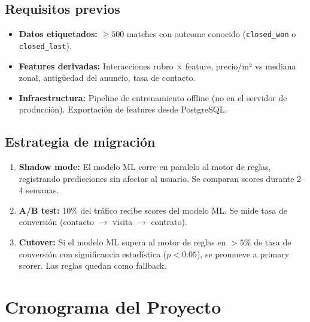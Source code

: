 \documentclass[11pt,a4paper]{article}
\begin{document}
\subsection{Requisitos previos}
\begin{itemize}
    \item \textbf{Datos etiquetados:} $\geq 500$ matches con outcome conocido (\texttt{closed\_won} o \texttt{closed\_lost}).
    \item \textbf{Features derivadas:} Interacciones rubro $\times$ feature, precio/m² vs mediana zonal, antigüedad del anuncio, tasa de contacto.
    \item \textbf{Infraestructura:} Pipeline de entrenamiento offline (no en el servidor de producción). Exportación de features desde PostgreSQL.
\end{itemize}

\subsection{Estrategia de migración}
\begin{enumerate}
    \item \textbf{Shadow mode:} El modelo ML corre en paralelo al motor de reglas, registrando predicciones sin afectar al usuario. Se comparan scores durante 2--4 semanas.
    \item \textbf{A/B test:} 10\% del tráfico recibe scores del modelo ML. Se mide tasa de conversión (contacto $\rightarrow$ visita $\rightarrow$ contrato).
    \item \textbf{Cutover:} Si el modelo ML supera al motor de reglas en $>5\%$ de tasa de conversión con significancia estadística ($p < 0.05$), se promueve a primary scorer. Las reglas quedan como fallback.
\end{enumerate}

\section{Cronograma del Proyecto}
\end{document}
